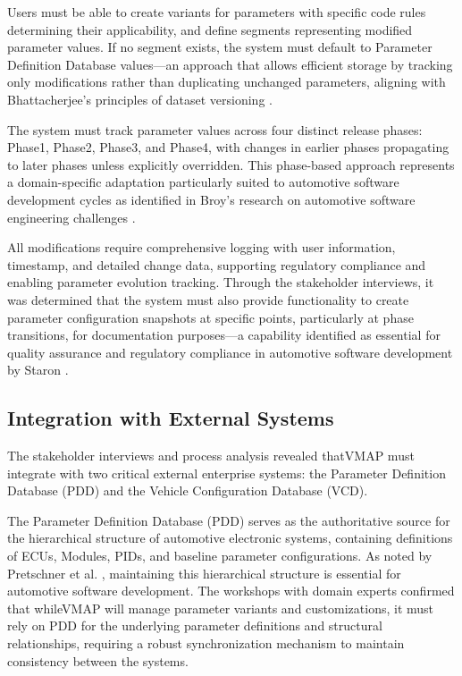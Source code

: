 Users must be able to create variants for parameters with specific code rules determining their applicability, and define segments representing modified parameter values. If no segment exists, the system must default to Parameter Definition Database values—an approach that allows efficient storage by tracking only modifications rather than duplicating unchanged parameters, aligning with Bhattacherjee's principles of dataset versioning \cite{bhattacherjee2015principles}.

The system must track parameter values across four distinct release phases: Phase1, Phase2, Phase3, and Phase4, with changes in earlier phases propagating to later phases unless explicitly overridden. This phase-based approach represents a domain-specific adaptation particularly suited to automotive software development cycles as identified in Broy's research on automotive software engineering challenges \cite{broy2006challenges}.

All modifications require comprehensive logging with user information, timestamp, and detailed change data, supporting regulatory compliance and enabling parameter evolution tracking. Through the stakeholder interviews, it was determined that the system must also provide functionality to create parameter configuration snapshots at specific points, particularly at phase transitions, for documentation purposes—a capability identified as essential for quality assurance and regulatory compliance in automotive software development by Staron \cite{staron2021automotive}.

\subsection{Integration with External Systems}
\label{subsec:integration-external-systems}

The stakeholder interviews and process analysis revealed that\ac{VMAP} must integrate with two critical external enterprise systems: the Parameter Definition Database (PDD) and the Vehicle Configuration Database (VCD).

The Parameter Definition Database (PDD) serves as the authoritative source for the hierarchical structure of automotive electronic systems, containing definitions of \acp{ECU}, Modules, PIDs, and baseline parameter configurations. As noted by Pretschner et al. \cite{pretschner2007software}, maintaining this hierarchical structure is essential for automotive software development. The workshops with domain experts confirmed that while\ac{VMAP} will manage parameter variants and customizations, it must rely on PDD for the underlying parameter definitions and structural relationships, requiring a robust synchronization mechanism to maintain consistency between the systems.

